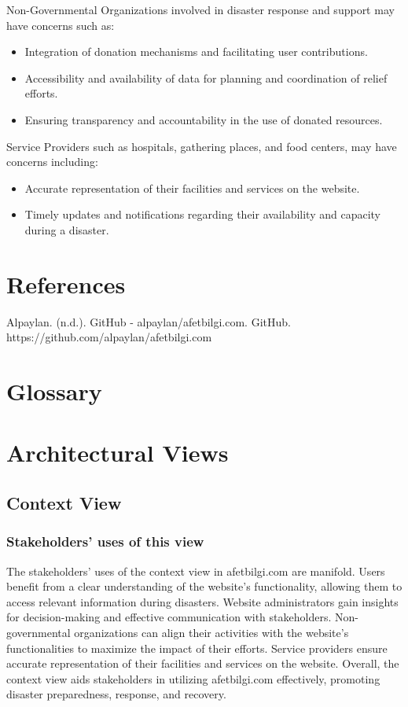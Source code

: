 \documentclass[12pt]{report}
\begin{document}
Non-Governmental Organizations involved in disaster response and support may have concerns such as:
\begin{itemize}
    \item Integration of donation mechanisms and facilitating user contributions.
    \item Accessibility and availability of data for planning and coordination of relief efforts.
    \item Ensuring transparency and accountability in the use of donated resources.
\end{itemize}


Service Providers such as hospitals, gathering places, and food centers, may have concerns including:
\begin{itemize}
    \item Accurate representation of their facilities and services on the website.
    \item Timely updates and notifications regarding their availability and capacity during a disaster.
\end{itemize}


\chapter{References}

Alpaylan. (n.d.). GitHub - alpaylan/afetbilgi.com. GitHub. https://github.com/alpaylan/afetbilgi.com

\chapter{Glossary}

\chapter{Architectural Views}

\section{Context View}

\subsection{Stakeholders' uses of this view}
The stakeholders' uses of the context view in afetbilgi.com are manifold. Users benefit from a clear understanding of the website's functionality, 
allowing them to access relevant information during disasters. Website administrators gain insights for decision-making and effective communication 
with stakeholders. Non-governmental organizations can align their activities with the website's functionalities to maximize the impact of their
efforts. Service providers ensure accurate representation of their facilities and services on the website. Overall, the context view aids stakeholders 
in utilizing afetbilgi.com effectively, promoting disaster preparedness, response, and recovery.
\end{document}

